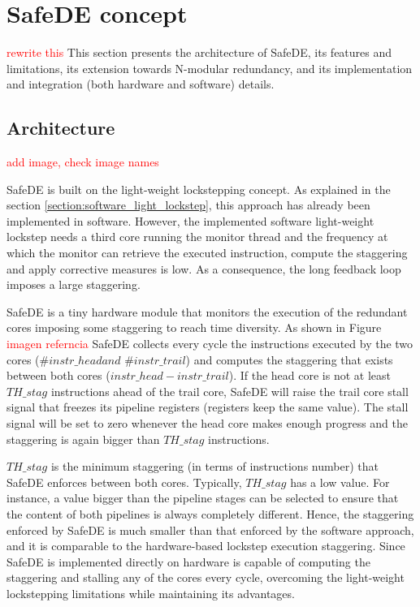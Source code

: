 \clearpage
\newpage
\section{SafeDE concept}

\textcolor{red}{rewrite this}
This section presents the architecture of SafeDE, its features and limitations, its extension towards N-modular redundancy, and its implementation and integration (both hardware and software) details.

\bigskip


\subsection{Architecture}

\textcolor{red}{add image, check image names}

SafeDE is built on the light-weight lockstepping concept. As explained in the section \ref{section:software_light_lockstep}, this approach has already been implemented in software. However, the implemented software light-weight lockstep needs a third core running the monitor thread and the frequency at which the monitor can retrieve the executed instruction, compute the staggering and apply corrective measures is low. As a consequence, the long feedback loop imposes a large staggering. 

SafeDE is a tiny hardware module that monitors the execution of the redundant cores imposing some staggering to reach time diversity. As shown in Figure \textcolor{red}{imagen referncia} SafeDE collects every cycle the instructions executed by the two cores ($\#instr\_head and$ $\#instr\_trail$) and computes the staggering that exists between both cores ($instr\_head - instr\_trail$). If the head core is not at least $TH\_stag$ instructions ahead of the trail core, SafeDE will raise the trail core stall signal that freezes its pipeline registers (registers keep the same value). The stall signal will be set to zero whenever the head core makes enough progress and the staggering is again bigger than $TH\_stag$ instructions.

$TH\_stag$ is the minimum staggering (in terms of instructions number) that SafeDE enforces between both cores. Typically, $TH\_stag$ has a low value. For instance, a value bigger than the pipeline stages can be selected to ensure that the content of both pipelines is always completely different. Hence, the staggering enforced by SafeDE is much smaller than that enforced by the software approach, and it is comparable to the hardware-based lockstep execution staggering. Since SafeDE is implemented directly on hardware is capable of computing the staggering and stalling any of the cores every cycle, overcoming the light-weight lockstepping limitations while maintaining its advantages.

